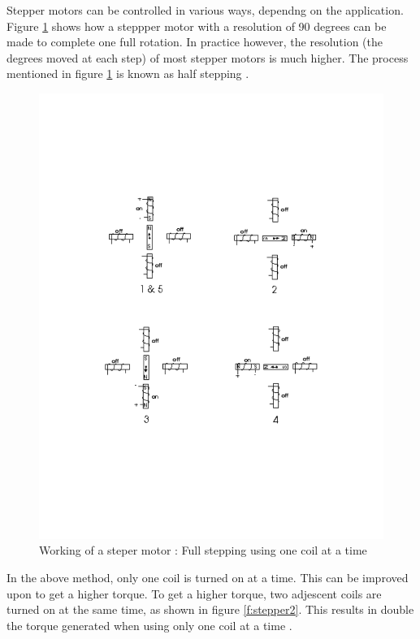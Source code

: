 \documentclass[sigconf]{acmart}
\begin{document}
Stepper motors can be controlled in various ways, dependng on the application. 
Figure \ref{f:stepper1} shows how a steppper motor with a resolution of 90 degrees can be made to complete one full rotation. In practice however, the resolution (the degrees moved at each step) of most stepper motors is much higher. The process mentioned in figure \ref{f:stepper1} is known as half stepping \cite{stepper1}.

\begin{figure}[!ht]
  \centering\includegraphics[width=\columnwidth]{images/stepper1.pdf}
  \caption{Working of a steper motor : Full stepping using one coil at a time \cite{stepper1}}\label{f:stepper1}
\end{figure}

In the above method, only one coil is turned on at a time. This can be improved upon to get a higher torque. To get a higher torque, two adjescent coils are turned on at the same time, as shown in figure \ref{f:stepper2}. This results in double the torque generated when using only one coil at a time \cite{stepper2}.
\end{document}
